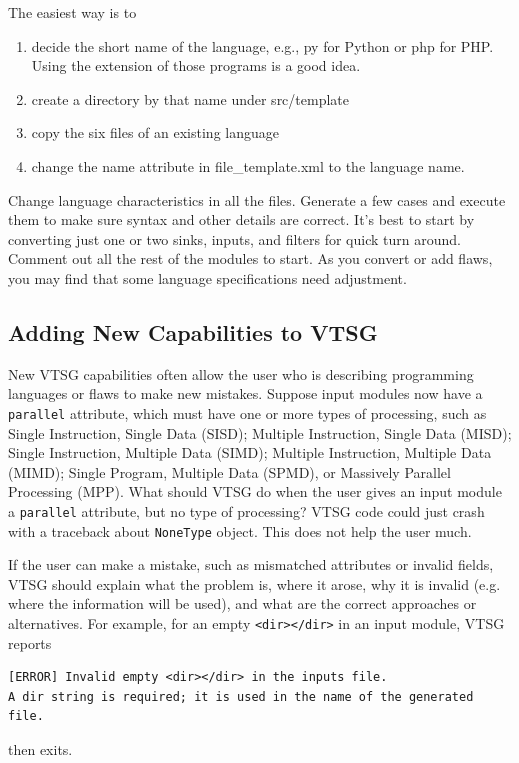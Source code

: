 \documentclass[12pt]{article}
\begin{document}
The easiest way is to
\begin{enumerate}[nosep]
\item decide the short name of the language, e.g., py for Python or php for
  PHP.  Using the extension of those programs is a good idea.
\item create a directory by that name under src/template
\item copy the six files of an existing language
\item change the name attribute in file\_template.xml to the language name.
\end{enumerate}
Change language characteristics in all the files.  Generate a few cases and
execute them to make sure syntax and other details are correct.  It's best to
start by converting just one or two sinks, inputs, and filters for quick turn around.
Comment out all the rest of the modules to start.
As you convert or add flaws, you may find that some language specifications need
adjustment.


\subsection{Adding New Capabilities to VTSG}

New VTSG capabilities often allow the user who is describing programming languages or
flaws to make new mistakes.  Suppose input modules now have a \verb|parallel|
attribute, which must have one or more types of processing, such as Single
Instruction, Single Data (SISD); Multiple Instruction, Single Data (MISD); Single
Instruction, Multiple Data (SIMD); Multiple Instruction, Multiple Data (MIMD); Single
Program, Multiple Data (SPMD), or Massively Parallel Processing (MPP).  What should
VTSG do when the user gives an input module a \verb|parallel| attribute, but no type
of processing?  VTSG code could just crash with a traceback about \verb|NoneType|
object.  This does not help the user much.

If the user can make a mistake, such as mismatched attributes or invalid fields, VTSG
should explain what the problem is, where it arose, why it is invalid (e.g. where the
information will be used), and what are the correct approaches or alternatives.  For
example, for an empty \verb|<dir></dir>| in an input module, VTSG reports
\begin{verbatim}
[ERROR] Invalid empty <dir></dir> in the inputs file.
A dir string is required; it is used in the name of the generated file.
\end{verbatim}
then exits.
\end{document}
